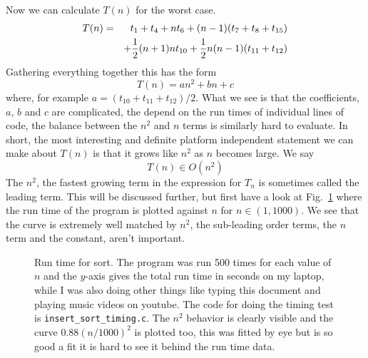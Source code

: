 \documentclass[11pt,a4paper]{scrartcl}
\begin{document}
Now we can calculate $T(n)$ for the worst case.
\begin{eqnarray}
T(n)&=&t_1+t_4+nt_6+(n-1)(t_7+t_8+t_{15})\cr&&+\frac{1}{2}(n+1)nt_{10}+\frac{1}{2}n(n-1)(t_{11}+t_{12})
\end{eqnarray}
Gathering everything together this has the form
\begin{equation}
T(n)=an^2+bn+c
\end{equation}
where, for example $a=(t_{10}+t_{11}+t_{12})/2$. What we see is that
the coefficients, $a$, $b$ and $c$ are complicated, the depend on the
run times of individual lines of code, the balance between the $n^2$
and $n$ terms is similarly hard to evaluate. In short, the most
interesting and definite platform independent statement we can make
about $T(n)$ is that it grows like $n^2$ as $n$ becomes large. We say
\begin{equation}
T(n)\in O(n^2)
\end{equation}
The $n^2$, the fastest growing term in the expression for $T_n$ is
sometimes called the leading term. This will be discussed further, but
first have a look at Fig.~\ref{fig_insert_sort_timing} where the run
time of the program is plotted against $n$ for $n\in(1,1000)$. We see
that the curve is extremely well matched by $n^2$, the sub-leading
order terms, the $n$ term and the constant, aren't important.

\begin{figure}

\caption{Run time for sort. The program was run 500 times for each
  value of $n$ and the $y$-axis gives the total run time in seconds on
  my laptop, while I was also doing other things like typing this
  document and playing music videos on youtube. The code for doing the
  timing test is {\tt insert\_sort\_timing.c}. The $n^2$ behavior is
  clearly visible and the curve $0.88(n/1000)^2$ is plotted too, this
  was fitted by eye but is so good a fit it is hard to see it behind
  the run time data.\label{fig_insert_sort_timing}}
\end{figure}
\end{document}

